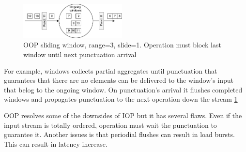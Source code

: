 \begin{figure}[htbp]
  \centering
  \includegraphics[width=0.48\textwidth]{pics/oop}
  \caption{OOP sliding window, range=3, slide=1. Operation must block last window until next punctuation arrival }
  \label {oop}
\end{figure}

For example, windows collects partial aggregates until punctuation that guarantees that there are no elements can be delivered to the window's input that belog to the ongoing window.  On punctuation's arrival it flushes completed windows and propagates punctuation to the next operation down the stream \ref{oop}

OOP resolves some of the downsides of IOP but it has several flaws. Even if the input stream is totally ordered, operation must wait the punctuation to guarantee it. Another issues is that periodial flushes can result in load bursts. This can result in latency increase.
